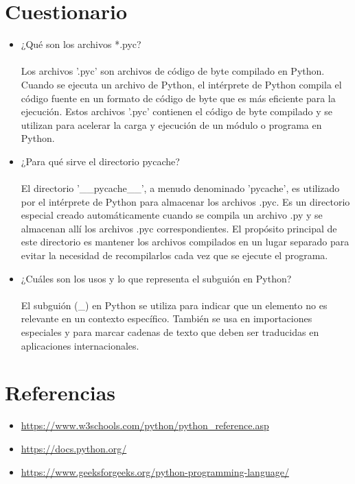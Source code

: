 \documentclass{article}
\begin{document}
	\section{Cuestionario}
	\begin{itemize}
		\item ¿Qué son los archivos *.pyc? \\ \\
		Los archivos '.pyc' son archivos de código de byte compilado en Python. Cuando se ejecuta un archivo de Python, el intérprete de Python compila el código fuente en un formato de código de byte que es más eficiente para la ejecución. Estos archivos '.pyc' contienen el código de byte compilado y se utilizan para acelerar la carga y ejecución de un módulo o programa en Python.
		\item ¿Para qué sirve el directorio pycache? \\ \\
		El directorio '\_\_pycache\_\_', a menudo denominado 'pycache', es utilizado por el intérprete de Python para almacenar los archivos .pyc. Es un directorio especial creado automáticamente cuando se compila un archivo .py y se almacenan allí los archivos .pyc correspondientes. El propósito principal de este directorio es mantener los archivos compilados en un lugar separado para evitar la necesidad de recompilarlos cada vez que se ejecute el programa.
		\item ¿Cuáles son los usos y lo que representa el subguión en Python? \\ \\
		El subguión (\_) en Python se utiliza para indicar que un elemento no es relevante en un contexto específico. También se usa en importaciones especiales y para marcar cadenas de texto que deben ser traducidas en aplicaciones internacionales.
	\end{itemize}	
	
	\section{Referencias}
	\begin{itemize}			
		\item \url{https://www.w3schools.com/python/python_reference.asp}
		\item \url{https://docs.python.org/}
		\item \url{https://www.geeksforgeeks.org/python-programming-language/}
	\end{itemize}	
\end{document}
